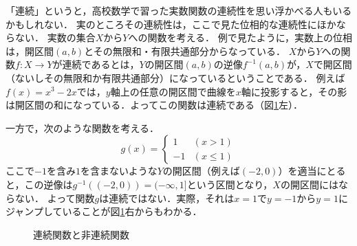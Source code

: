 \documentclass[11pt,a4paper]{jsarticle}
\begin{document}
\begin{develop}
「連続」というと，高校数学で習った実数関数の連続性を思い浮かべる人もいるかもしれない．
実のところその連続性は，ここで見た位相的な連続性にほかならない．
実数の集合$X$から$Y$への関数を考える．
例\label{ex:real}で見たように，実数上の位相は，開区間$(a,b)$とその無限和・有限共通部分からなっている．
$X$から$Y$への関数$f:X \to Y$が連続であるとは，$Y$の開区間$(a,b)$の逆像$f^{-1}(a,b)$が，$X$で開区間（ないしその無限和か有限共通部分）になっているということである．
例えば$f(x) = x^3-2x$では，$y$軸上の任意の開区間で曲線を$x$軸に投影すると，その影は開区間の和になっている．よってこの関数は連続である（図\ref{fig:realcontinuous}左）．

一方で，次のような関数を考える．
\[
g(x) = \left\{
\begin{array}{ll}
1 & (x > 1)\\
-1 & (x \leq 1)
\end{array}
\right. 
\]
ここで$-1$を含み$1$を含まないような$Y$の開区間（例えば$(-2, 0)$）を適当にとると，この逆像は$g^{-1}((-2, 0)) = (-\infty, 1]$という区間となり，$X$の開区間にはならない．
よって関数$g$は連続ではない．実際，それは$x=1$で$y=-1$から$y=1$にジャンプしていることが図\ref{fig:realcontinuous}右からもわかる．

\begin{figure}[h]
  \begin{minipage}[b]{0.45\linewidth}
    \centering
  \end{minipage}
  \begin{minipage}[b]{0.45\linewidth}
  \end{minipage}
 \caption{連続関数と非連続関数}
 \label{fig:realcontinuous}
\end{figure}
\end{develop}
\end{document}
